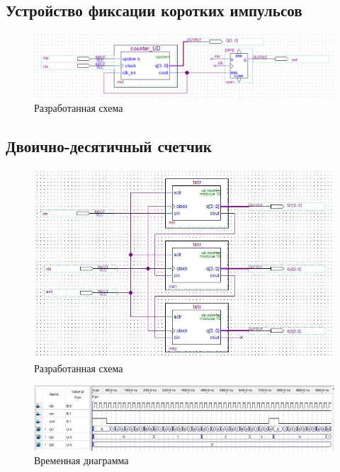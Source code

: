 \documentclass[a4paper,12pt]{article}
\begin{document}
    \subsection{Устройство фиксации коротких импульсов}
    \begin{figure}[H]
        \centering
        \includegraphics[width=\linewidth]{scheme_filter}
        \caption{Разработанная схема}
    \end{figure}
    \subsection{Двоично-десятичный счетчик}
    \begin{figure}[H]
        \centering
        \includegraphics[width=\linewidth]{scheme_5}
        \caption{Разработанная схема}
    \end{figure}
    \begin{figure}[H]
        \centering
        \includegraphics[width=\linewidth]{wave_5}
        \caption{Временная диаграмма}
    \end{figure}
\end{document}
